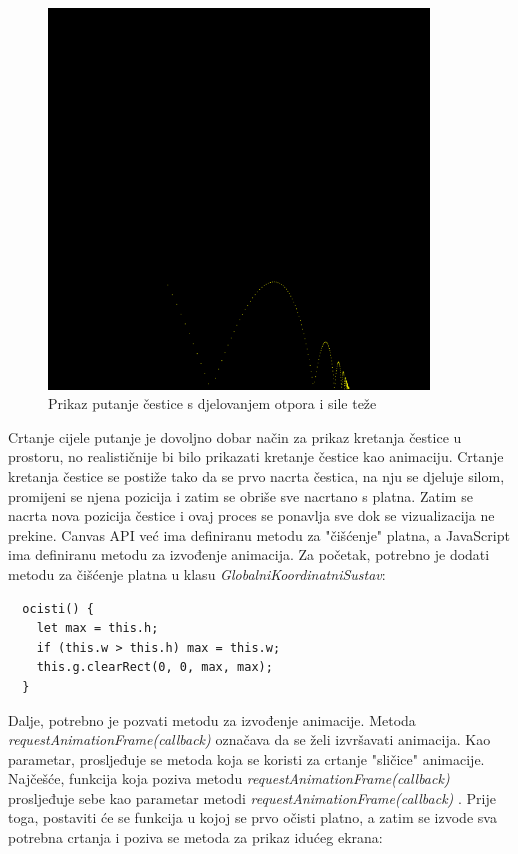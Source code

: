 \documentclass{foi}
\begin{document}
\begin{figure}[H]
    \centering
    \includegraphics[width=0.9\textwidth]{slike/13_PutanjaCesticeOtporSilaTeza.png}
    \captionsetup{justification=centering}
    \caption{Prikaz putanje čestice s djelovanjem otpora i sile teže}
\label{fig:PutanjaCesticeOtporSilaTeza}
\end{figure}

Crtanje cijele putanje je dovoljno dobar način za prikaz kretanja čestice u prostoru, no realističnije bi bilo prikazati kretanje čestice kao animaciju. Crtanje kretanja čestice se postiže tako da se prvo nacrta čestica, na nju se djeluje silom, promijeni se njena pozicija i zatim se obriše sve nacrtano s platna. Zatim se nacrta nova pozicija čestice i ovaj proces se ponavlja sve dok se vizualizacija ne prekine. Canvas API već ima definiranu metodu za "čišćenje" platna, a JavaScript ima definiranu metodu za izvođenje animacija. Za početak, potrebno je dodati metodu za čišćenje platna u klasu \textit{GlobalniKoordinatniSustav}:

\begin{verbatim}
  ocisti() {
    let max = this.h;
    if (this.w > this.h) max = this.w;
    this.g.clearRect(0, 0, max, max);
  }
\end{verbatim}

Dalje, potrebno je pozvati metodu za izvođenje animacije. Metoda \textit{requestAnimationFrame(callback)} označava da se želi izvršavati animacija. Kao parametar, prosljeđuje se metoda koja se koristi za crtanje "sličice" animacije. Najčešće, funkcija koja poziva metodu \textit{requestAnimationFrame(callback)} prosljeđuje sebe kao parametar metodi \textit{requestAnimationFrame(callback)} \parencite{RequestAnimationFrame}. Prije toga, postaviti će se funkcija u kojoj se prvo očisti platno, a zatim se izvode sva potrebna crtanja i poziva se metoda za prikaz idućeg ekrana:
\end{document}
